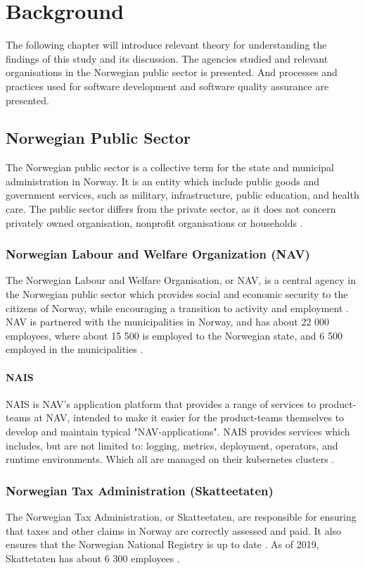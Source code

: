 \chapter{Background}
The following chapter will introduce relevant theory for understanding the findings of this study and its discussion. The agencies studied and relevant organisations in the Norwegian public sector is presented. And processes and practices used for software development and software quality assurance are presented. 

\section{Norwegian Public Sector}
The Norwegian public sector is a collective term for the state and municipal administration in Norway. It is an entity which include public goods and government services, such as military, infrastructure, public education, and health care. The public sector differs from the private sector, as it does not concern privately owned organisation, nonprofit organisations or households \cite{os_snl_2022}\cite{ps_wiki_2023}.

\subsection{Norwegian Labour and Welfare Organization (NAV)}
The Norwegian Labour and Welfare Organisation, or NAV, is a central agency in the Norwegian public sector which provides social and economic security to the citizens of Norway, while encouraging a transition to activity and employment \cite{nav_r_2023}. NAV is partnered with the municipalities in Norway, and has about 22 000 employees, where about 15 500 is employed to the Norwegian state, and 6 500 employed in the municipalities \cite{org_nav_2023}. 

\subsubsection{NAIS}
NAIS is NAV's application platform that provides a range of services to product-teams at NAV, intended to make it easier for the product-teams themselves to develop and maintain typical "NAV-applications". NAIS provides services which includes, but are not limited to: logging, metrics, deployment, operators, and runtime environments. Which all are managed on their \gls{kubernetes} clusters \cite{nais_2023}.

\subsection{Norwegian Tax Administration (Skatteetaten)}
The Norwegian Tax Administration, or Skatteetaten, are responsible for ensuring that taxes and other claims in Norway are correctly assessed and paid. It also ensures that the Norwegian National Registry is up to date \cite{skatt_r_2023}. As of 2019, Skattetaten has about 6 300 employees \cite{skatt_r_2023}. 

